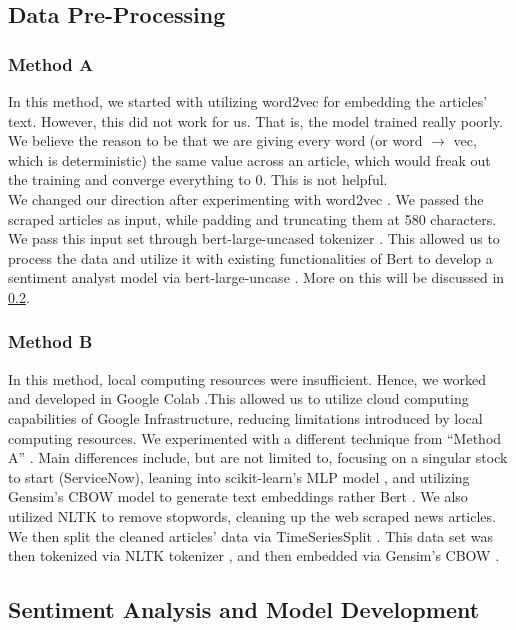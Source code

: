 \documentclass[twocolumn,12pt]{article}
\begin{document}
\begin{flushleft}
	\subsection{Data Pre-Processing} \label{data_preprocessing}
		\subsubsection{Method A \cite{metha}} \label{method_a}
		In this method, we started with utilizing word2vec \cite{w2v} for embedding the articles' text. However, this did not work for us. That is, the model trained really poorly. We believe the reason to be that we are giving every word (or word $\rightarrow$ vec, which is deterministic) the same value across an article, which would freak out the training and converge everything to 0. This is not helpful.\\
		We changed our direction after experimenting with word2vec \cite{w2v}. We passed the scraped articles as input, while padding and truncating them at 580 characters. We pass this input set through bert-large-uncased tokenizer \cite{bert}. This allowed us to process the data and utilize it with existing functionalities of Bert \cite{bert} to develop a sentiment analyst model via bert-large-uncase \cite{bert}. More on this will be discussed in \cref{model_dev}.
		
		\subsubsection{Method B \cite{methb}} \label{method_b}
		In this method, local computing resources were insufficient. Hence, we worked and developed in Google Colab \cite{colab}.This allowed us to utilize cloud computing capabilities of Google Infrastructure, reducing limitations introduced by local computing resources. We experimented with a different technique from \enquote{Method A} \cite{metha}. Main differences include, but are not limited to, focusing on a singular stock to start (ServiceNow), leaning into scikit-learn's MLP model \cite{skmlp}, and utilizing Gensim's CBOW model \cite{gensim} to generate text embeddings rather Bert \cite{bert}. We also utilized NLTK \cite{nltk} to remove stopwords, cleaning up the web scraped news articles. We then split the cleaned articles' data via TimeSeriesSplit \cite{tssplit}. This data set was then tokenized via NLTK tokenizer \cite{nltk}, and then embedded via Gensim's CBOW \cite{gensim}.
			
	\subsection{Sentiment Analysis and Model Development} \label{model_dev}
	

\end{flushleft}
\end{document}
